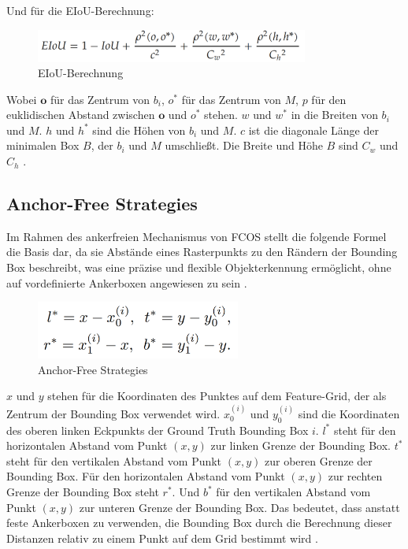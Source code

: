 \documentclass[a4paper,12pt]{article}
\begin{document}
\noindent Und für die EIoU-Berechnung:

\begin{figure}[h]
    \centering
    \includegraphics[width=0.8\textwidth, height=\textheight, keepaspectratio]{Bild3.png}
    \caption{EIoU-Berechnung}
    \label{fig:bild3}
\end{figure}

\noindent Wobei $\mathbf{o}$ für das Zentrum von $b_i$, $o^*$ für das Zentrum von $M$, $p$ für den euklidischen Abstand zwischen $\mathbf{o}$ und $o^*$ stehen. $w$ und $w^*$ in die Breiten von $b_i$ und $M$. $h$ und $h^*$ sind die Höhen von $b_i$ und $M$. $c$ ist die diagonale Länge der minimalen Box $B$, der $b_i$ und $M$ umschließt. Die Breite und Höhe $B$ sind $C_w$ und $C_h$ \cite{han2023improving}.

\subsection{Anchor-Free Strategies}
Im Rahmen des ankerfreien Mechanismus von FCOS stellt die folgende Formel die Basis dar, da sie Abstände eines Rasterpunkts zu den Rändern der Bounding Box beschreibt, was eine präzise und flexible Objekterkennung ermöglicht, ohne auf vordefinierte Ankerboxen angewiesen zu sein \cite{tian2019fcos, wang2018anchor}.

\begin{figure}[h]
    \centering
    \includegraphics[width=0.6\textwidth, height=\textheight, keepaspectratio]{Bild4.png}
    \caption{Anchor-Free Strategies}
    \label{fig:bild4}
\end{figure}



\noindent $x$ und $y$ stehen für die Koordinaten des Punktes auf dem Feature-Grid, der als Zentrum der Bounding Box verwendet wird. $x_0^{(i)}$ und $y_0^{(i)}$ sind die Koordinaten des oberen linken Eckpunkts der Ground Truth Bounding Box $i$. $l^*$ steht für den horizontalen Abstand vom Punkt $(x,y)$ zur linken Grenze der Bounding Box. $t^*$ steht für den vertikalen Abstand vom Punkt $(x,y)$ zur oberen Grenze der Bounding Box. Für den horizontalen Abstand vom Punkt $(x,y)$ zur rechten Grenze der Bounding Box steht $r^*$. Und $b^*$ für den vertikalen Abstand vom Punkt $(x,y)$ zur unteren Grenze der Bounding Box.
Das bedeutet, dass anstatt feste Ankerboxen zu verwenden, die Bounding Box durch die Berechnung dieser Distanzen relativ zu einem Punkt auf dem Grid bestimmt wird \cite{tian2019fcos, wang2018anchor}.
\end{document}
